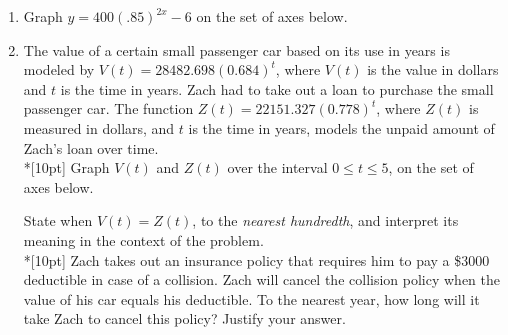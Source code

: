 \documentclass[12pt, oneside]{article}
\begin{document}
\begin{enumerate}
\item Graph $y=400(.85)^{2x}-6$ on the set of axes below.
\begin{center}
\end{center} %

\item The value of a certain small passenger car based on its use in years is modeled by $V(t) =28482.698(0.684)^t$, where $V(t)$ is the value in dollars and $t$ is the time in years. Zach had to take out a loan to purchase the small passenger car. The function $Z(t)=22151.327(0.778)^t$, where $Z(t)$ is measured in dollars, and $t$ is the time in years, models the unpaid amount of Zach’s loan over time.\\*[10pt]
Graph $V(t)$ and $Z(t)$ over the interval $0 \leq t \leq 5$, on the set of axes below.
\begin{center}
\end{center}
State when $V(t)=Z(t)$, to the \emph{nearest hundredth}, and interpret its meaning in the context of the problem.\\*[10pt]
Zach takes out an insurance policy that requires him to pay a \$3000 deductible in case of a collision. Zach will cancel the collision policy when the value of his car equals his deductible. To the nearest year, how long will it take Zach to cancel this policy? Justify your answer. %


\end{enumerate}
\end{document}
